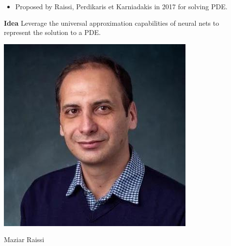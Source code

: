 \documentclass[aspectratio=169,compress,12pt,dvipsnames]{beamer}
\begin{document}
\begin{frame}
  \vfill
  \begin{minipage}{.68\textwidth}
    \begin{itemize}
      \item Proposed by Raissi, Perdikaris et Karniadakis in 2017 for solving PDE.
    \end{itemize}
    \bigskip
    \textbf{Idea}  \hspace{1em}  Leverage the universal approximation capabilities of neural nets to represent the solution to a PDE.
  \end{minipage}%
  \hfill
  \begin{minipage}{.28\textwidth}
    \centering
    \includegraphics[width=\textwidth]{mazar_raissi.jpeg}
    \par
    {\tiny
    Maziar Raissi
    }
  \end{minipage}
  \vfill
\end{frame}
\end{document}
